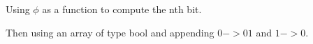 
\undercons


Using $\phi$ as a function to compute the nth bit.

Then using an array of type bool and appending $0 -> 01$ and $1 -> 0$.


